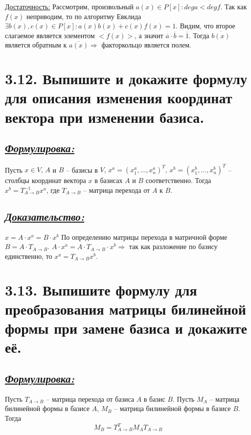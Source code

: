 \documentclass{article}
\begin{document}
\underline{Достаточность:}
\newline Рассмотрим, произвольный $a(x) \in P[x] : dega < degf$. Так как $f(x)$ неприводим, то по алгоритму Евклида $\exists b(x), c(x) \in P[x] : a(x) b(x) + c(x) f(x) = 1$. Видим, что второе слагаемое является элементом $<f(x)>$, а значит $\overline{a}\cdot \overline{b} = \overline{1}$. Тогда $\overline{b(x)}$ является обратным к $\overline{a(x)} \Rightarrow$ факторкольцо является полем. 

\section*{\LARGE 3.12. Выпишите и докажите формулу для описания изменения координат вектора при изменении базиса. }
\subsection*{\Large \underline{\textit{Формулировка: }}}
Пусть $x \in V,\, A$ и $B$ -- базисы в $V, \, x^a = (x_1^a, ..., x_n^a)^T, \, x^b = (x_1^b, ..., x_n^b)^T$ -- столбцы координат вектора $x$ в базисах $A$ и $B$ соответственно. Тогда $x^b = T_{A \rightarrow B}^{-1} x^a$, где $T_{A \rightarrow B}$ -- матрица перехода от $A$ к $B$.

\subsection*{\Large \underline{\textit{Доказательство: }}}
$x = A \cdot x^a = B \cdot x^b$
\newline По определению матрицы перехода в матричной форме $B = A \cdot T_{A \rightarrow B}$.
\newline $A \cdot x^a = A \cdot T_{A \rightarrow B} \cdot x^b \Rightarrow$ так как разложение по базису единственно, то $x^a = T_{A \rightarrow B} x^b$.

\section*{\LARGE 3.13. Выпишите формулу для преобразования матрицы билинейной формы при замене базиса и докажите её. }
\subsection*{\Large \underline{\textit{Формулировка: }}}
Пусть $T_{A \rightarrow B}$ -- матрица перехода от базиса $A$ в базис $B$. Пусть $M_A$ -- матрица билинейной формы в базисе $A$, $M_B$ -- матрица билинейной формы в базисе $B$. Тогда 
$$
M_B = T_{A \rightarrow B}^T M_A T_{A \rightarrow B}
$$
\end{document}
